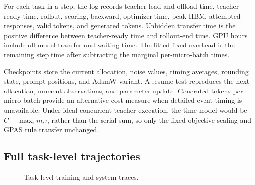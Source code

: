 For each task in a step, the log records teacher load and offload time,
teacher-ready time, rollout, scoring, backward, optimizer time, peak HBM,
attempted responses, valid tokens, and generated tokens. Unhidden transfer time
is the positive difference between teacher-ready time and rollout-end time. GPU
hours include all model-transfer and waiting time. The fitted fixed overhead is
the remaining step time after subtracting the marginal per-micro-batch times.

Checkpoints store the current allocation, noise values, timing averages,
rounding state, prompt positions, and AdamW variant. A resume test reproduces
the next allocation, moment observations, and parameter update. Generated
tokens per micro-batch provide an alternative cost measure when detailed event
timing is unavailable. Under ideal concurrent teacher execution, the time model would
be $C+\max_i m_i\tau_i$ rather than the serial sum, so only the fixed-objective
scaling and GPAS rule transfer unchanged.

\subsection{Full task-level trajectories}

\begin{figure}[H]
    \centering
    \caption{Task-level training and system traces.
    }
    \label{fig:appendix_task_curves}
\end{figure}
